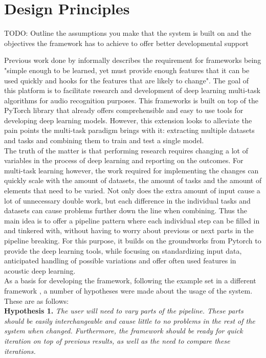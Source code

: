 \section{Design Principles}

TODO: Outline the assumptions you make that the system is built on and the objectives the framework has to achieve to offer better developmental support

Previous work done by \cite{roberts1996evolving} informally describes the requirement for frameworks being "simple enough to be learned, yet must provide enough features that it can be used quickly and hooks for the features that are likely to change". The goal of this platform is to facilitate research and development of deep learning multi-task algorithms for audio recognition purposes. This frameworks is built on top of the PyTorch library that already offers comprehensible and easy to use tools for developing deep learning models. However, this extension looks to alleviate the pain points the multi-task paradigm brings with it: extracting multiple datasets and tasks and combining them to train and test a single model. \\

The truth of the matter is that performing research requires changing a lot of variables in the process of deep learning and reporting on the outcomes. For multi-task learning however, the work required for implementing the changes can quickly scale with the amount of datasets, the amount of tasks and the amount of elements that need to be varied. Not only does the extra amount of input cause a lot of unnecessary double work, but each difference in the individual tasks and datasets can cause problems further down the line when combining. Thus the main idea is to offer a pipeline pattern where each individual step can be filled in and tinkered with, without having to worry about previous or next parts in the pipeline breaking. For this purpose, it builds on the groundworks from Pytorch to provide the deep learning tools, while focusing on standardizing input data, anticipated handling of possible variations and offer often used features in acoustic deep learning. \\ 

As a basis for developing the framework, following the example set in a different framework \cite{de2012deap}, a number of hypotheses were made about the usage of the system. These are as follows: \\

\textbf{Hypothesis 1.} \textit{The user will need to vary parts of the pipeline. These parts should be easily interchangeable and cause little to no problems in the rest of the system when changed. Furthermore, the framework should be ready for quick iteration on top of previous results, as well as the need to compare these iterations.}\\

